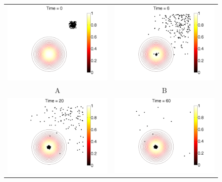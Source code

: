 \documentclass[12pt]{article}
\begin{document}
	\begin{figure}[hb]
	\begin{tabular}{cc}
		\includegraphics[width=3.25in]{figures/MosqViz_ruleset01_paramset013_run01_001.png} & \includegraphics[width=3.25in]{figures/MosqViz_ruleset01_paramset013_run01_025.png}\\
		A & B \\
		\includegraphics[width=3.25in]{figures/MosqViz_ruleset01_paramset013_run01_061.png} & \includegraphics[width=3.25in]{figures/MosqViz_ruleset01_paramset013_run01_111.png}\\

\end{tabular}
\end{figure}
\end{document}

